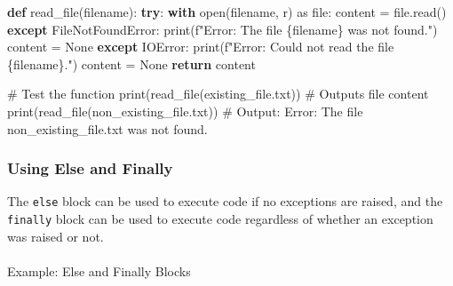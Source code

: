 \documentclass[
  letterpaper,
  DIV=11,
  numbers=noendperiod]{scrreprt}
\makeatletter
\let\oldparagraph\paragraph
\renewcommand{\paragraph}{
    \@ifstar
      \xxxParagraphStar
      \xxxParagraphNoStar
  }
\newcommand{\xxxParagraphStar}[1]{\oldparagraph*{#1}\mbox{}}
\newcommand{\xxxParagraphNoStar}[1]{\oldparagraph{#1}\mbox{}}
\newenvironment{Shaded}{\begin{snugshade}}{\end{snugshade}}
\newcommand{\BuiltInTok}[1]{\textcolor[rgb]{0.00,0.23,0.31}{#1}}
\newcommand{\CommentTok}[1]{\textcolor[rgb]{0.37,0.37,0.37}{#1}}
\newcommand{\ControlFlowTok}[1]{\textcolor[rgb]{0.00,0.23,0.31}{\textbf{#1}}}
\newcommand{\ImportTok}[1]{\textcolor[rgb]{0.00,0.46,0.62}{#1}}
\newcommand{\KeywordTok}[1]{\textcolor[rgb]{0.00,0.23,0.31}{\textbf{#1}}}
\newcommand{\NormalTok}[1]{\textcolor[rgb]{0.00,0.23,0.31}{#1}}
\newcommand{\OperatorTok}[1]{\textcolor[rgb]{0.37,0.37,0.37}{#1}}
\newcommand{\PreprocessorTok}[1]{\textcolor[rgb]{0.68,0.00,0.00}{#1}}
\newcommand{\SpecialCharTok}[1]{\textcolor[rgb]{0.37,0.37,0.37}{#1}}
\newcommand{\SpecialStringTok}[1]{\textcolor[rgb]{0.13,0.47,0.30}{#1}}
\newcommand{\StringTok}[1]{\textcolor[rgb]{0.13,0.47,0.30}{#1}}
\newcommand{\VariableTok}[1]{\textcolor[rgb]{0.07,0.07,0.07}{#1}}
\makeatother
\begin{document}
\begin{Shaded}
\begin{Highlighting}[]
\KeywordTok{def}\NormalTok{ read\_file(filename):}
    \ControlFlowTok{try}\NormalTok{:}
        \ControlFlowTok{with} \BuiltInTok{open}\NormalTok{(filename, }\StringTok{\textquotesingle{}r\textquotesingle{}}\NormalTok{) }\ImportTok{as} \BuiltInTok{file}\NormalTok{:}
\NormalTok{            content }\OperatorTok{=} \BuiltInTok{file}\NormalTok{.read()}
    \ControlFlowTok{except} \PreprocessorTok{FileNotFoundError}\NormalTok{:}
        \BuiltInTok{print}\NormalTok{(}\SpecialStringTok{f"Error: The file \textquotesingle{}}\SpecialCharTok{\{}\NormalTok{filename}\SpecialCharTok{\}}\SpecialStringTok{\textquotesingle{} was not found."}\NormalTok{)}
\NormalTok{        content }\OperatorTok{=} \VariableTok{None}
    \ControlFlowTok{except} \PreprocessorTok{IOError}\NormalTok{:}
        \BuiltInTok{print}\NormalTok{(}\SpecialStringTok{f"Error: Could not read the file \textquotesingle{}}\SpecialCharTok{\{}\NormalTok{filename}\SpecialCharTok{\}}\SpecialStringTok{\textquotesingle{}."}\NormalTok{)}
\NormalTok{        content }\OperatorTok{=} \VariableTok{None}
    \ControlFlowTok{return}\NormalTok{ content}

\CommentTok{\# Test the function}
\BuiltInTok{print}\NormalTok{(read\_file(}\StringTok{\textquotesingle{}existing\_file.txt\textquotesingle{}}\NormalTok{))  }\CommentTok{\# Outputs file content}
\BuiltInTok{print}\NormalTok{(read\_file(}\StringTok{\textquotesingle{}non\_existing\_file.txt\textquotesingle{}}\NormalTok{))  }\CommentTok{\# Output: Error: The file \textquotesingle{}non\_existing\_file.txt\textquotesingle{} was not found.}
\end{Highlighting}
\end{Shaded}

\subsubsection{Using Else and Finally}\label{using-else-and-finally}

The \texttt{else} block can be used to execute code if no exceptions are
raised, and the \texttt{finally} block can be used to execute code
regardless of whether an exception was raised or not.

\paragraph{Example: Else and Finally
Blocks}\label{example-else-and-finally-blocks}
\end{document}
